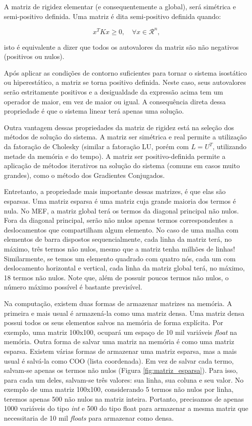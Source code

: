         A matriz de rigidez elementar (e consequentemente a global), será simétrica e semi-positivo definida. Uma matriz é dita semi-positivo definida quando:

        \begin{equation}
            x^T K x \geq 0, \quad \forall x \in \mathcal{R}^n,
        \end{equation}

        \noindent isto é equivalente a dizer que todos os autovalores da matriz são não negativos (positivos ou nulos).

        Após aplicar as condições de contorno suficientes para tornar o sistema isostático ou hiperestático, a matriz se torna positivo definida. Neste caso, seus autovalores serão estritamente positivos e a desigualdade da expressão acima tem um operador de maior, em vez de maior ou igual. A consequência direta dessa propriedade é que o sistema linear terá apenas uma solução.

        Outra vantagem dessas propriedades da matriz de rigidez está na seleção dos métodos de solução do sistema. A matriz ser simétrica e real permite a utilização da fatoração de Cholesky (similar a fatoração LU, porém com $L = U^T$, utilizando metade da memória e do tempo). A matriz ser positivo-definida permite a aplicação de métodos iterativos na solução do sistema (comuns em casos muito grandes), como o método dos Gradientes Conjugados.

        Entretanto, a propriedade mais importante dessas matrizes, é que elas são esparsas. Uma matriz esparsa é uma matriz cuja grande maioria dos termos é nula. No MEF, a matriz global terá os termos da diagonal principal não nulos. Fora da diagonal principal, serão não nulos apenas termos correspondentes a deslocamentos que compartilham algum elemento. No caso de uma malha com elementos de barra dispostos sequencialmente, cada linha da matriz terá, no máximo, três termos não nulos, mesmo que a matriz tenha milhões de linhas! Similarmente, se temos um elemento quadrado com quatro nós, cada um com deslocamento horizontal e vertical, cada linha da matriz global terá, no máximo, 18 termos não nulos. Note que, além de possuir poucos termos não nulos, o número máximo possível é bastante previsível.

        Na computação, existem duas formas de armazenar matrizes na memória. A primeira e mais usual é armazená-la como uma matriz densa. Uma matriz densa possui todos os seus elementos salvos na memória de forma explícita. Por exemplo, uma matriz 100x100, ocupará um espaço de 10 mil variáveis \textit{float} na memória. Outra forma de salvar uma matriz na memória é como uma matriz esparsa. Existem várias formas de armazenar uma matriz esparsa, mas a mais usual é salvá-la como COO (lista coordenada). Em vez de salvar cada termo, salvam-se apenas os termos não nulos (Figura \ref{fig:matriz_esparsa}). Para isso, para cada um deles, salvam-se três valores: sua linha, sua coluna e seu valor. No exemplo de uma matriz 100x100, considerando 5 termos não nulos por linha, teremos apenas 500 não nulos na matriz inteira. Portanto, precisamos de apenas 1000 variáveis do tipo \textit{int} e 500 do tipo float para armazenar a mesma matriz que necessitaria de 10 mil \textit{floats} para armazenar como densa.

